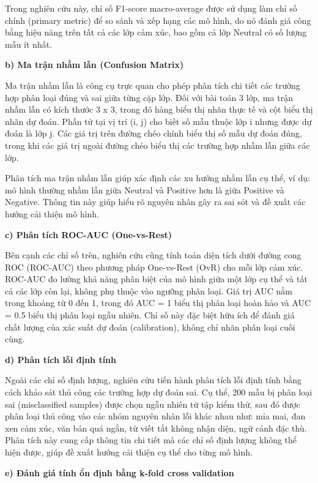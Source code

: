 \documentclass[14pt, a4paper]{report}
\begin{document}
Trong nghiên cứu này, chỉ số F1-score macro-average được sử dụng làm chỉ số chính (primary metric) để so sánh và xếp hạng các mô hình, do nó đánh giá công bằng hiệu năng trên tất cả các lớp cảm xúc, bao gồm cả lớp Neutral có số lượng mẫu ít nhất.


\textbf{b) Ma trận nhầm lẫn (Confusion Matrix)}


Ma trận nhầm lẫn là công cụ trực quan cho phép phân tích chi tiết các trường hợp phân loại đúng và sai giữa từng cặp lớp. Đối với bài toán 3 lớp, ma trận nhầm lẫn có kích thước 3 x 3, trong đó hàng biểu thị nhãn thực tế và cột biểu thị nhãn dự đoán. Phần tử tại vị trí (i, j) cho biết số mẫu thuộc lớp i nhưng được dự đoán là lớp j. Các giá trị trên đường chéo chính biểu thị số mẫu dự đoán đúng, trong khi các giá trị ngoài đường chéo biểu thị các trường hợp nhầm lẫn giữa các lớp.


Phân tích ma trận nhầm lẫn giúp xác định các xu hướng nhầm lẫn cụ thể, ví dụ: mô hình thường nhầm lẫn giữa Neutral và Positive hơn là giữa Positive và Negative. Thông tin này giúp hiểu rõ nguyên nhân gây ra sai sót và đề xuất các hướng cải thiện mô hình.


\textbf{c) Phân tích ROC-AUC (One-vs-Rest)}


Bên cạnh các chỉ số trên, nghiên cứu cũng tính toán diện tích dưới đường cong ROC (ROC-AUC) theo phương pháp One-vs-Rest (OvR) cho mỗi lớp cảm xúc. ROC-AUC đo lường khả năng phân biệt của mô hình giữa một lớp cụ thể và tất cả các lớp còn lại, không phụ thuộc vào ngưỡng phân loại. Giá trị AUC nằm trong khoảng từ 0 đến 1, trong đó AUC = 1 biểu thị phân loại hoàn hảo và AUC = 0.5 biểu thị phân loại ngẫu nhiên. Chỉ số này đặc biệt hữu ích để đánh giá chất lượng của xác suất dự đoán (calibration), không chỉ nhãn phân loại cuối cùng.


\textbf{d) Phân tích lỗi định tính}


Ngoài các chỉ số định lượng, nghiên cứu tiến hành phân tích lỗi định tính bằng cách khảo sát thủ công các trường hợp dự đoán sai. Cụ thể, 200 mẫu bị phân loại sai (misclassified samples) được chọn ngẫu nhiên từ tập kiểm thử, sau đó được phân loại thủ công vào các nhóm nguyên nhân lỗi khác nhau như: mỉa mai, đan xen cảm xúc, văn bản quá ngắn, từ viết tắt không nhận diện, ngữ cảnh đặc thù. Phân tích này cung cấp thông tin chi tiết mà các chỉ số định lượng không thể hiện được, giúp đề xuất hướng cải thiện cụ thể cho từng mô hình.


\textbf{e) Đánh giá tính ổn định bằng k-fold cross validation}
\end{document}
